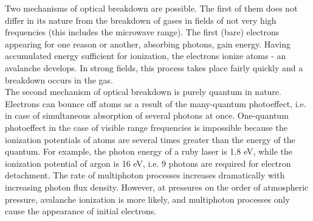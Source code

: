 \documentclass[a4paper,14pt]{extreport}
\begin{document}
Two mechanisms of optical breakdown are possible. The first of them does not differ in its nature from the breakdown of gases in fields of not very high frequencies (this includes the microwave range). The first (bare) electrons appearing for one reason or another, absorbing photons, gain energy. Having accumulated energy sufficient for ionization, the electrons ionize atoms - an avalanche develops. In strong fields, this process takes place fairly quickly and a breakdown occurs in the gas. \\

The second mechanism of optical breakdown is purely quantum in nature. Electrons can bounce off atoms as a result of the many-quantum
photoeffect, i.e. in case of simultaneous absorption of several photons at once. One-quantum photoeffect in the case of visible range frequencies is impossible because the ionization potentials of atoms are several times greater than the energy of the quantum. For example, the photon energy of a ruby laser is 1.8 eV, while the ionization potential of argon is 16 eV, i.e. 9 photons are required for electron detachment. The rate of multiphoton processes increases dramatically with increasing photon flux density. However, at pressures on the order of atmospheric pressure, avalanche ionization is more likely, and multiphoton processes only cause the appearance of initial electrons.
\end{document}
